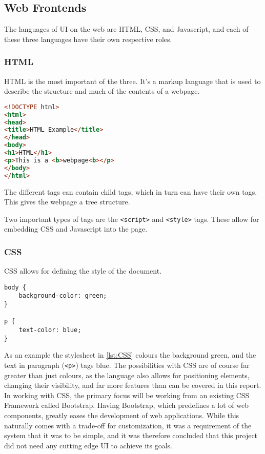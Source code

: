 \documentclass[../../master.tex]{subfiles}
\begin{document}
\subsection{Web Frontends} \label{sec:webfrontends}
The languages of UI on the web are HTML, CSS, and Javascript, and each of these three languages have their own respective roles.\cite{nixonweb}
\subsubsection*{HTML}
HTML is the most important of the three.
It's a markup language that is used to describe the structure and much of the contents of a webpage.
\begin{lstlisting}[language=HTML,caption={An example HTML page},label=lst:HTML]
<!DOCTYPE html>
<html>
<head>
<title>HTML Example</title>
</head>
<body>
<h1>HTML</h1>
<p>This is a <b>webpage<b></p>
</body>
</html>
\end{lstlisting}
The different tags can contain child tags, which in turn can have their own tags.
This gives the webpage a tree structure.

Two important types of tags are the \texttt{<script>} and \texttt{<style>} tags.
These allow for embedding CSS and Javascript into the page.

\subsubsection*{CSS}
CSS allows for defining the style of the document.
\begin{lstlisting}[caption={A simple CSS style with blue text on a green background},label=lst:CSS]
body {
	background-color: green;
}

p {
	text-color: blue;
}
\end{lstlisting}
As an example the stylesheet in \cref{lst:CSS} colours the background green, and the text in paragraph (\texttt{<p>}) tags blue.
The possibilities with CSS are of course far greater than just colours, as the language also allows for positioning elements, changing their visibility, and far more features than can be covered in this report.\cite{nixonweb}
In working with CSS, the primary focus will be working from an existing CSS Framework called Bootstrap.
Having Bootstrap, which predefines a lot of web components, greatly eases the development of web applications.
While this naturally comes with a trade-off for customization, it was a requirement of the system that it was to be simple, and it was therefore concluded that this project did not need any cutting edge UI to achieve its goals.
\end{document}
